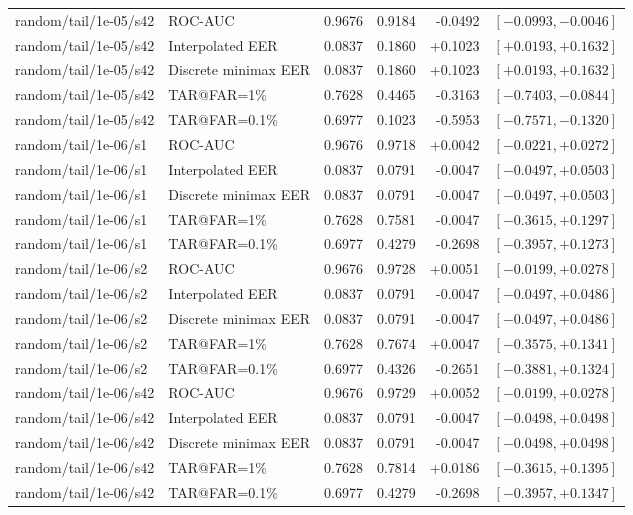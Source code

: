 \begin{table}[!t]
\begin{tabular}{@{}llrrrr@{}}
random/tail/1e-05/s42 & ROC-AUC & 0.9676 & 0.9184 & -0.0492 & $[-0.0993,-0.0046]$ \\
random/tail/1e-05/s42 & Interpolated EER & 0.0837 & 0.1860 & +0.1023 & $[+0.0193,+0.1632]$ \\
random/tail/1e-05/s42 & Discrete minimax EER & 0.0837 & 0.1860 & +0.1023 & $[+0.0193,+0.1632]$ \\
random/tail/1e-05/s42 & TAR@FAR=1\% & 0.7628 & 0.4465 & -0.3163 & $[-0.7403,-0.0844]$ \\
random/tail/1e-05/s42 & TAR@FAR=0.1\% & 0.6977 & 0.1023 & -0.5953 & $[-0.7571,-0.1320]$ \\
random/tail/1e-06/s1 & ROC-AUC & 0.9676 & 0.9718 & +0.0042 & $[-0.0221,+0.0272]$ \\
random/tail/1e-06/s1 & Interpolated EER & 0.0837 & 0.0791 & -0.0047 & $[-0.0497,+0.0503]$ \\
random/tail/1e-06/s1 & Discrete minimax EER & 0.0837 & 0.0791 & -0.0047 & $[-0.0497,+0.0503]$ \\
random/tail/1e-06/s1 & TAR@FAR=1\% & 0.7628 & 0.7581 & -0.0047 & $[-0.3615,+0.1297]$ \\
random/tail/1e-06/s1 & TAR@FAR=0.1\% & 0.6977 & 0.4279 & -0.2698 & $[-0.3957,+0.1273]$ \\
random/tail/1e-06/s2 & ROC-AUC & 0.9676 & 0.9728 & +0.0051 & $[-0.0199,+0.0278]$ \\
random/tail/1e-06/s2 & Interpolated EER & 0.0837 & 0.0791 & -0.0047 & $[-0.0497,+0.0486]$ \\
random/tail/1e-06/s2 & Discrete minimax EER & 0.0837 & 0.0791 & -0.0047 & $[-0.0497,+0.0486]$ \\
random/tail/1e-06/s2 & TAR@FAR=1\% & 0.7628 & 0.7674 & +0.0047 & $[-0.3575,+0.1341]$ \\
random/tail/1e-06/s2 & TAR@FAR=0.1\% & 0.6977 & 0.4326 & -0.2651 & $[-0.3881,+0.1324]$ \\
random/tail/1e-06/s42 & ROC-AUC & 0.9676 & 0.9729 & +0.0052 & $[-0.0199,+0.0278]$ \\
random/tail/1e-06/s42 & Interpolated EER & 0.0837 & 0.0791 & -0.0047 & $[-0.0498,+0.0498]$ \\
random/tail/1e-06/s42 & Discrete minimax EER & 0.0837 & 0.0791 & -0.0047 & $[-0.0498,+0.0498]$ \\
random/tail/1e-06/s42 & TAR@FAR=1\% & 0.7628 & 0.7814 & +0.0186 & $[-0.3615,+0.1395]$ \\
random/tail/1e-06/s42 & TAR@FAR=0.1\% & 0.6977 & 0.4279 & -0.2698 & $[-0.3957,+0.1347]$ \\
\bottomrule
\end{tabular}
\end{table}
